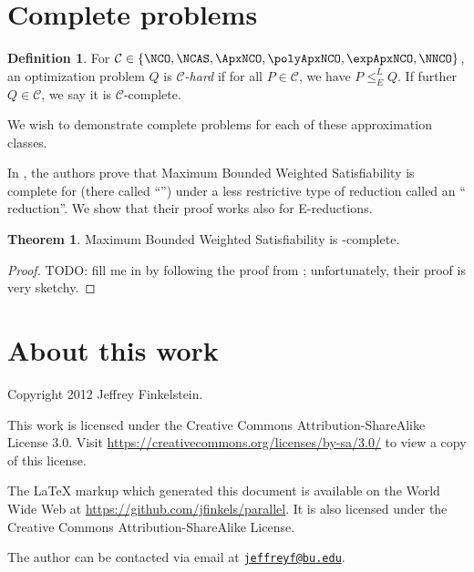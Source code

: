 \documentclass[draft]{article}
\theoremstyle{definition}
\newtheorem{definition}{Definition}
\newtheorem{theorem}{Theorem}
\newcommand{\Er}{\leq_E^{L}}
\newcommand{\email}[1]{\href{mailto:#1}{\nolinkurl{#1}}}
\begin{document}
\section{Complete problems}

\begin{definition}
  For $\mathcal{C}\in \{\NCO, \NCAS, \ApxNCO, \polyApxNCO, \expApxNCO, \NNCO\}$, an optimization problem $Q$ is \emph{$\mathcal{C}$-hard} if for all $P\in\mathcal{C}$, we have $P\Er Q$.
  If further $Q\in\mathcal{C}$, we say it is $\mathcal{C}$-complete.
\end{definition}

We wish to demonstrate complete problems for each of these approximation classes.

In \cite{sx95}, the authors prove that Maximum Bounded Weighted Satisfiability is complete for \ApxNCO{} (there called ``\NCX'') under a less restrictive type of reduction called an ``\NCAS{} reduction''.
We show that their proof works also for E-reductions.
\begin{theorem}
  Maximum Bounded Weighted Satisfiability is \ApxNCO-complete.
\end{theorem}
\begin{proof}
  TODO: fill me in by following the proof from \cite{sx95}; unfortunately, their proof is very sketchy.
\end{proof}

\section{About this work}

Copyright 2012 Jef{}frey Finkelstein.

This work is licensed under the Creative Commons Attribution-ShareAlike License 3.0.
Visit \mbox{\url{https://creativecommons.org/licenses/by-sa/3.0/}} to view a copy of this license.

The \LaTeX{} markup which generated this document is available on the World Wide Web at \mbox{\url{https://github.com/jfinkels/parallel}}.
It is also licensed under the Creative Commons Attribution-ShareAlike License.

The author can be contacted via email at \email{jeffreyf@bu.edu}.



\end{document}
